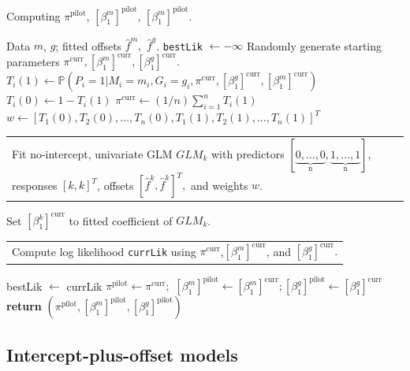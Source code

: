 \documentclass[12pt]{article}
\makeatletter
\newcommand{\multiline}[1]{%
	\begin{tabularx}{\dimexpr\linewidth-\ALG@thistlm}[t]{@{}X@{}}
		#1
	\end{tabularx}
}
\makeatother
\begin{document}
\begin{appendices}
\begin{refsection}
\begin{algorithm}
			\caption{Computing $\pi^\textrm{pilot}$, $[\beta^m_1]^\textrm{pilot}$, $[\beta^m_1]^\textrm{pilot}$.}\label{algo:pilot_estimates_2}
			\begin{algorithmic}[2]
				\Require Data $m$, $g$; fitted offsets $\hat{f}^m,$ $\hat{f}^g$.
				\State \texttt{bestLik} $\gets -\infty$ 
				\State Randomly generate starting parameters $\pi^\textrm{curr}, [\beta_1^m]^\textrm{curr}, [\beta^g_1]^\textrm{curr}.$
				 
				\State $T_i(1) \gets \mathbb{P}(P_i = 1 | M_i = m_i, G_i = g_i, \pi^\textrm{curr}, [\beta^g_1]^\textrm{curr}, [\beta_1^m]^\textrm{curr})$
				\State $T_i(0) \gets 1 - T_i(1)$
				\EndFor
				\State $\pi^{\textrm{curr}} \gets (1/n) \sum_{i=1}^n T_i(1)$ 
				\State $w \gets [T_1(0), T_2(0), \dots, T_n(0), T_1(1), T_2(1), \dots, T_n(1)]^T$
				\State \multiline{Fit no-intercept, univariate GLM $GLM_k$ with predictors $[\underbrace{0, \dots, 0}_\textrm{n}, \underbrace{1, \dots, 1}_\textrm{n}]$, responses $[k,k]^T$, offsets $[\hat{f}^k, \hat{f}^k]^T,$ and weights $w$.}
				\State Set $[\beta^k_1]^\textrm{curr}$ to fitted coefficient of $GLM_k$.
				\EndFor
				\State \multiline{
					Compute log likelihood \texttt{currLik} using $\pi^\textrm{curr}$,$ [\beta^m_1]^\textrm{curr}$, and $[\beta^g_1]^\textrm{curr}.$}
				\EndWhile
				\State bestLik $\gets$ currLik
				\State $\pi^\textrm{pilot} \gets \pi^\textrm{curr};$ $[\beta^m_1]^\textrm{pilot} \gets [\beta^m_1]^\textrm{curr}; [\beta^g_1]^\textrm{pilot} \gets [\beta^g_1]^\textrm{curr}$
				\EndIf
				\EndFor
				\State \textbf{return} $(\pi^\textrm{pilot}, [\beta^m_1]^\textrm{pilot}, [\beta^g_1]^\textrm{pilot})$
			\end{algorithmic}
\end{algorithm}
		
\subsection{Intercept-plus-offset models}\label{sec:int_plus_offset}
		

\end{refsection}
\end{appendices}
\end{document}
